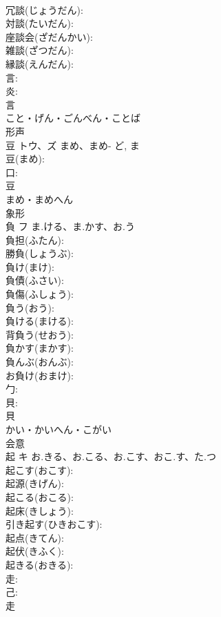 \documentclass[8pt]{extreport}
\begin{document}
\begin{CJK}{UTF8}{min}
\\	冗談(じょうだん): 
\\	対談(たいだん): 
\\	座談会(ざだんかい): 
\\	雑談(ざつだん): 
\\	縁談(えんだん): 
\\	言: 
\\	炎: 
\\	言	
\\	こと・げん・ごんべん・ことば	
\\	形声 
\\	豆	トウ、ズ	まめ、まめ-	ど, ま	
\\	豆(まめ): 
\\	口: 
\\	豆	
\\	まめ・まめへん	
\\	象形 
\\	負	フ	ま.ける、ま.かす、お.う		
\\	負担(ふたん): 
\\	勝負(しょうぶ): 
\\	負け(まけ): 
\\	負債(ふさい): 
\\	負傷(ふしょう): 
\\	負う(おう): 
\\	負ける(まける): 
\\	背負う(せおう): 
\\	負かす(まかす): 
\\	負んぶ(おんぶ): 
\\	お負け(おまけ): 
\\	勹: 
\\	貝: 
\\	貝	
\\	かい・かいへん・こがい	
\\	会意 
\\	起	キ	お.きる、お.こる、お.こす、おこ.す、た.つ		
\\	起こす(おこす): 
\\	起源(きげん): 
\\	起こる(おこる): 
\\	起床(きしょう): 
\\	引き起す(ひきおこす): 
\\	起点(きてん): 
\\	起伏(きふく): 
\\	起きる(おきる): 
\\	走: 
\\	己: 
\\	走	

\end{CJK}
\end{document}
